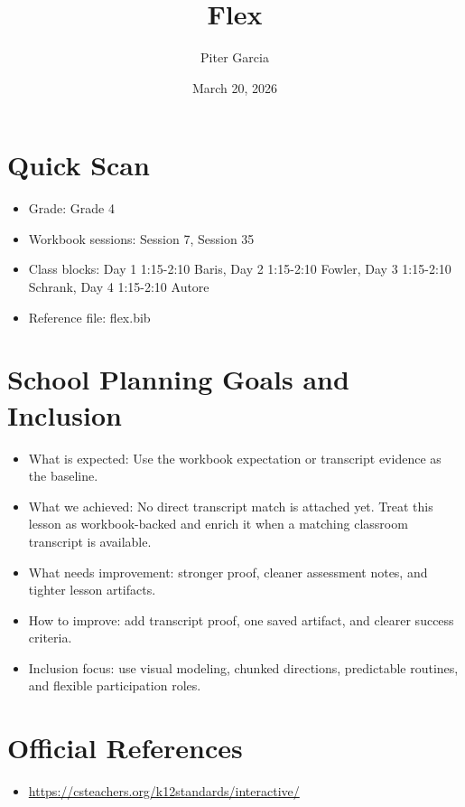 \documentclass[11pt]{article}
\title{Flex}
\author{Piter Garcia}
\date{March 20, 2026}
\begin{document}
\maketitle
\section*{Quick Scan}
\begin{itemize}[leftmargin=*]
\item Grade: Grade 4
\item Workbook sessions: Session 7, Session 35
\item Class blocks: Day 1 1:15-2:10 Baris, Day 2 1:15-2:10 Fowler, Day 3 1:15-2:10 Schrank, Day 4 1:15-2:10 Autore
\item Reference file: flex.bib
\end{itemize}
\section*{School Planning Goals and Inclusion}
\begin{itemize}[leftmargin=*]
\item What is expected: Use the workbook expectation or transcript evidence as the baseline.
\item What we achieved: No direct transcript match is attached yet. Treat this lesson as workbook-backed and enrich it when a matching classroom transcript is available.
\item What needs improvement: stronger proof, cleaner assessment notes, and tighter lesson artifacts.
\item How to improve: add transcript proof, one saved artifact, and clearer success criteria.
\item Inclusion focus: use visual modeling, chunked directions, predictable routines, and flexible participation roles.
\end{itemize}
\section*{Official References}
\begin{itemize}[leftmargin=*]
\item \url{https://csteachers.org/k12standards/interactive/}

\end{itemize}
\end{document}
